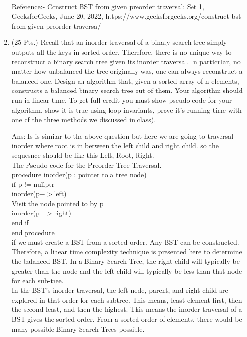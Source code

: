 \documentclass[margin=3mm]{article}
\begin{document}
\begin{enumerate}
\\Reference:- Construct BST from given preorder traversal: Set 1, GeeksforGeeks, June 20, 2022, https://www.geeksforgeeks.org/construct-bst-from-given-preorder-traversa/

\item (25 Pts.) Recall that an inorder traversal of a binary search tree simply outputs all the keys in sorted order. Therefore, there is no unique way to reconstruct a binary search tree given its inorder traversal. In particular, no matter how unbalanced the tree originally was, one can always reconstruct a balanced one. Design an algorithm that, given a sorted array of n elements, constructs a balanced binary search tree out of them. Your algorithm should run in linear time. To get full credit you must show pseudo-code for your algorithm, show it is true using loop invariants, prove it’s running time with one of the three methods we discussed in class).
\item[Ans: ]    Is is similar to the above question but here we are going to traversal inorder where root is in between the left child and right child. so the sequesnce should be like this Left, Root, Right.\\ 

The Pseudo code for the Preorder Tree Traversal.\\
procedure inorder(p : pointer to a tree node)\\
    if p != nullptr\\
        inorder(p$->$left)\\
        Visit the node pointed to by p\\
        inorder(p$->$right)\\
    end if\\
end procedure\\

if we must create a BST from a sorted order. Any BST can be constructed. Therefore, a linear time complexity technique is presented here to determine the balanced BST. 
In a Binary Search Tree, the right child will typically be greater than the node and the left child will typically be less than that node for each sub-tree.\\ 
In the BST's inorder traversal, the left node, parent, and right child are explored in that order for each subtree.
This means, least element first, then the second least, and then the highest.
This means the inorder traversal of a BST gives the sorted order. 
From a sorted order of elements, there would be many possible Binary Search Trees possible. \\


\end{enumerate}
\end{document}
